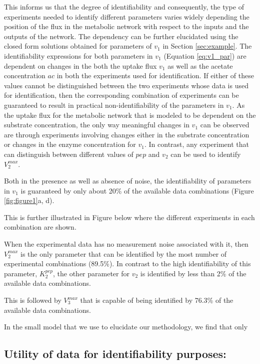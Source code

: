 \documentclass[10pt]{article}
\begin{document}
This informs us that the degree of identifiability and consequently, the type of experiments needed to identify different parameters varies widely depending the position of the flux in the metabolic network with respect to the inputs and the outputs of the network. The dependency can be further elucidated using the closed form solutions obtained for parameters of $v_1$ in Section \ref{sec:example}. The identifiability expressions for both parameters in $v_1$ (Equation \ref{eq:v1_par}) are dependent on changes in the both the uptake flux $v_1$ as well as the acetate concentration $ac$ in both the experiments used for identification. If either of these values cannot be distinguished between the two experiments whose data is used for identification, then the corresponding combination of experiments can be guaranteed to result in practical non-identifiability of the parameters in $v_1$. As the uptake flux for the metabolic network that is modeled to be dependent on the substrate concentration, the only way meaningful changes in $v_1$ can be observed are through experiments involving changes either in the substrate concentration or changes in the enzyme concentration for $v_1$.
In contrast, any experiment that can distinguish between different values of $pep$ and $v_2$ can be used to identify $V_2^{max}$. 




Both in the presence as well as absence of noise, the identifiability of parameters in $v_1$ is guaranteed by only about 20\% of the available data combinations (Figure \ref{fig:figure1}a, d). 

 This is further illustrated in Figure below where the different experiments in each combination are shown.



When the experimental data has no measurement noise associated with it, then $V_2^{max}$ is the only parameter that can be identified by the most number of experimental combinations (89.5\%). In contrast to the high identifiability of this parameter, $K_2^{pep}$, the other parameter for $v_2$ is identified by less than 2\% of the available data combinations.

This is followed by $V_3^{max}$ that is capable of being identified by 76.3\% of the available data combinations. 

In the small model that we use to elucidate our methodology, we find that only 



\subsection{Utility of data for identifiability purposes:}
\end{document}

